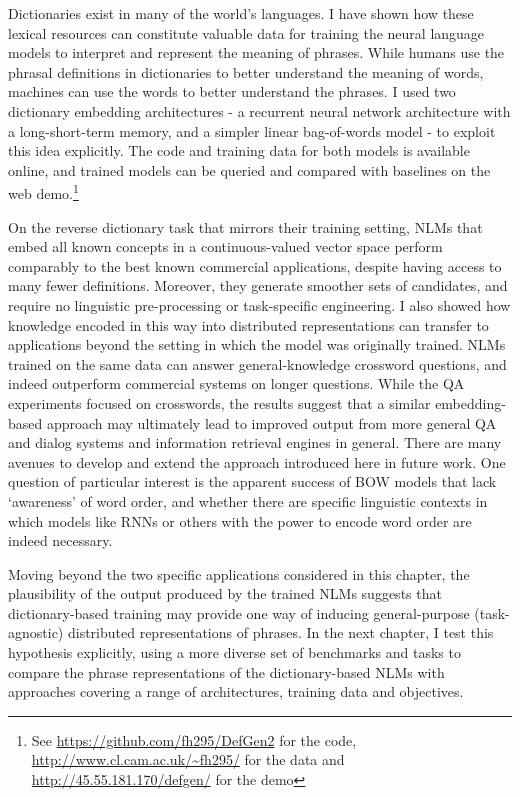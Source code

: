 Dictionaries exist in many of the world's languages. I have shown how these lexical resources can constitute valuable data for training the neural language models to interpret and represent the meaning of phrases. While humans use the phrasal definitions in dictionaries to better understand the meaning of words, machines can use the words to better understand the phrases. I used two dictionary embedding architectures - a recurrent neural network architecture with a long-short-term memory, and a simpler linear bag-of-words model - to exploit this idea explicitly. The code and training data for both models is available online, and trained models can be queried and compared with baselines on the web demo.\footnote{See \url{https://github.com/fh295/DefGen2} for the code, \url{http://www.cl.cam.ac.uk/~fh295/} for the data and \url{http://45.55.181.170/defgen/} for the demo}

On the reverse dictionary task that mirrors their training setting, NLMs that embed all known concepts in a continuous-valued vector space perform comparably to the best known commercial applications, despite having access to many fewer definitions. Moreover, they generate smoother sets of candidates, and require no linguistic pre-processing or task-specific engineering. I also showed how knowledge encoded in this way into distributed representations can transfer to applications beyond the setting in which the model was originally trained. NLMs trained on the same data can answer general-knowledge crossword questions, and indeed outperform commercial systems on longer questions. While the QA experiments focused on crosswords, the results suggest that a similar embedding-based approach may ultimately lead to improved output from more general QA and dialog systems and information retrieval engines in general. There are many avenues to develop and extend the approach introduced here in future work. One question of particular interest is the apparent success of BOW models that lack `awareness' of word order, and whether there are specific linguistic contexts in which models like RNNs or others with the power to encode word order are indeed necessary.  

Moving beyond the two specific applications considered in this chapter, the plausibility of the output produced by the trained NLMs suggests that dictionary-based training may provide one way of inducing general-purpose (task-agnostic) distributed representations of phrases. In the next chapter, I test this hypothesis explicitly, using a more diverse set of benchmarks and tasks to compare the phrase representations of the dictionary-based NLMs with approaches covering a range of architectures, training data and objectives. 

